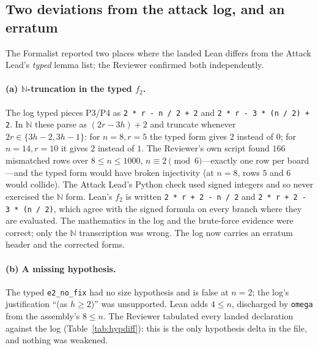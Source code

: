 \documentclass[11pt,a4paper]{article}
\theoremstyle{definition}
\theoremstyle{remark}
\newcommand{\lean}[1]{\texttt{#1}}
\newcommand{\N}{\mathbb{N}}
\begin{document}
\subsection{Two deviations from the attack log, and an erratum}
\label{sec:erratum}

The Formalist reported two places where the landed Lean differs from the Attack Lead's
\emph{typed} lemma list; the Reviewer confirmed both independently.

\paragraph{(a) $\N$-truncation in the typed $f_2$.}
The log typed pieces P3/P4 as \lean{2 * r - n / 2 + 2} and \lean{2 * r - 3 * (n / 2) + 2}.
In $\N$ these parse as $(2r-3h)+2$ and truncate whenever $2r\in\{3h-2,3h-1\}$: for
$n=8,r=5$ the typed form gives $2$ instead of $0$; for $n=14,r=10$ it gives $2$ instead of
$1$. The Reviewer's own script found $166$ mismatched rows over $8\le n\le 1000$,
$n\equiv 2\pmod 6$---exactly one row per board---and the typed form would have broken
injectivity (at $n=8$, rows $5$ and $6$ would collide). The Attack Lead's Python check used
signed integers and so never exercised the $\N$ form. Lean's $f_2$ is written
\lean{2 * r + 2 - n / 2} and \lean{2 * r + 2 - 3 * (n / 2)}, which agree with the
signed formula on every branch where they are evaluated. The mathematics in the log and the
brute-force evidence were correct; only the $\N$ transcription was wrong. The log now
carries an erratum header and the corrected forms.

\paragraph{(b) A missing hypothesis.}
The typed \lean{e2\_no\_fix} had no size hypothesis and is false at $n=2$; the log's
justification ``(as $h\ge 2$)'' was unsupported. Lean adds $4\le n$, discharged by
\lean{omega} from the assembly's $8\le n$. The Reviewer tabulated every landed declaration
against the log (Table~\ref{tab:hypdiff}): this is the only hypothesis delta in the file,
and nothing was weakened.
\end{document}
